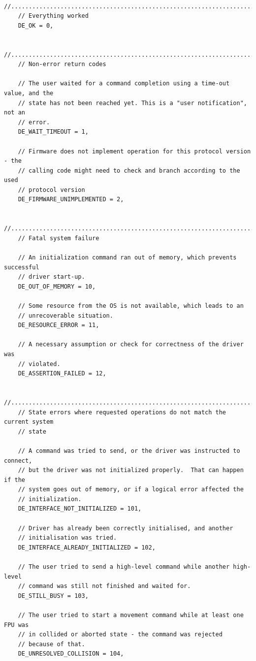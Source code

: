 \documentclass[fontsize=12,a4paper]{scrreprt}
\begin{document}
\begin{verbatim}
    //..........................................................................
    // Everything worked
    DE_OK = 0,

    //..........................................................................
    // Non-error return codes

    // The user waited for a command completion using a time-out value, and the
    // state has not been reached yet. This is a "user notification", not an
    // error.
    DE_WAIT_TIMEOUT = 1,

    // Firmware does not implement operation for this protocol version - the
    // calling code might need to check and branch according to the used
    // protocol version
    DE_FIRMWARE_UNIMPLEMENTED = 2,

    //..........................................................................
    // Fatal system failure

    // An initialization command ran out of memory, which prevents successful
    // driver start-up.
    DE_OUT_OF_MEMORY = 10,

    // Some resource from the OS is not available, which leads to an
    // unrecoverable situation.
    DE_RESOURCE_ERROR = 11,

    // A necessary assumption or check for correctness of the driver was
    // violated.
    DE_ASSERTION_FAILED = 12,

    //..........................................................................
    // State errors where requested operations do not match the current system
    // state

    // A command was tried to send, or the driver was instructed to connect,
    // but the driver was not initialized properly.  That can happen if the
    // system goes out of memory, or if a logical error affected the
    // initialization.
    DE_INTERFACE_NOT_INITIALIZED = 101,

    // Driver has already been correctly initialised, and another
    // initialisation was tried.
    DE_INTERFACE_ALREADY_INITIALIZED = 102,

    // The user tried to send a high-level command while another high-level
    // command was still not finished and waited for.
    DE_STILL_BUSY = 103,

    // The user tried to start a movement command while at least one FPU was
    // in collided or aborted state - the command was rejected
    // because of that.
    DE_UNRESOLVED_COLLISION = 104,


\end{verbatim}
\end{document}
